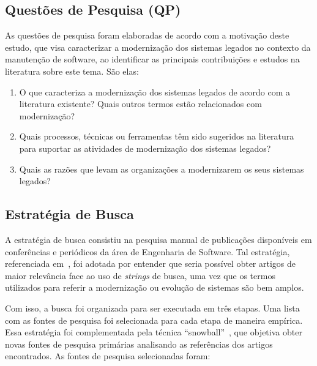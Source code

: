 \subsection{Questões de Pesquisa (QP)}

As questões de pesquisa foram elaboradas 
de acordo com a motivação deste estudo, 
que visa caracterizar a modernização dos sistemas legados 
no contexto da manutenção de software, ao identificar 
as principais contribuições e estudos na literatura sobre este tema. 
São elas:

\begin{enumerate}[(QP1)]
\item O que caracteriza a modernização dos sistemas legados de 
acordo com a literatura existente? Quais outros termos estão relacionados 
com modernização?

\item Quais processos, técnicas ou ferramentas têm sido sugeridos 
na literatura para suportar as atividades de modernização 
dos sistemas legados?

\item Quais as razões que levam as organizações a 
modernizarem os seus sistemas legados?

\end{enumerate}

\subsection{Estrat\'{e}gia de Busca}

A estratégia de busca consistiu 
na pesquisa manual de publicações disponíveis em conferências 
e periódicos da área de Engenharia de Software. 
Tal estratégia, referenciada em~\cite{kitchenham:2004}, foi adotada 
por entender que seria possível obter artigos de maior relevância 
face ao uso de \textit{strings} de busca, uma vez que os termos 
utilizados para referir a modernização ou evolução de sistemas 
são bem amplos. 

Com isso, a busca foi organizada para ser executada em três etapas. 
Uma lista com as fontes de pesquisa foi selecionada para cada etapa de 
maneira empírica. Essa estratégia foi complementada pela 
técnica ``snowball''~\cite{kitchenham:2004}, 
que objetiva obter novas fontes de pesquisa primárias analisando 
as refer\^{e}ncias dos artigos encontrados. 
As fontes de pesquisa selecionadas foram:

